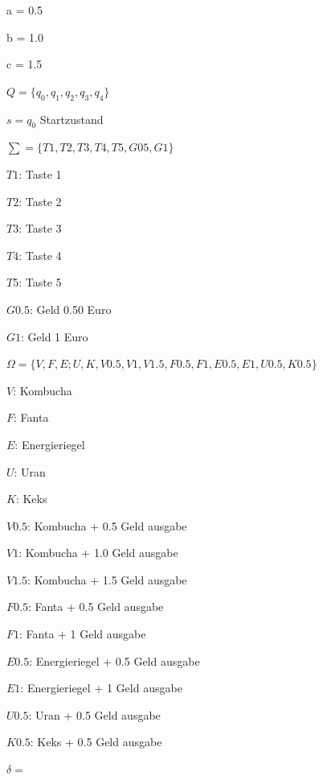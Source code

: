 \textpartdivider

\startitemize[packed]
\item
  a = 0.5
\item
  b = 1.0
\item
  c = 1.5
\stopitemize

\stopsectionlevel

\startsectionlevel[title={Automat},reference={automat}]

\startitemize[packed]
\item
  $Q = \{q_0, q_1, q_2, q_3, q_4\}$
\item
  $s = q_0$ Startzustand
\item
  $\sum = \{T1, T2, T3, T4, T5, G05, G1\}$
  \startitemize[packed]
  \item
    $T1$: Taste 1
  \item
    $T2$: Taste 2
  \item
    $T3$: Taste 3
  \item
    $T4$: Taste 4
  \item
    $T5$: Taste 5
  \item
    $G0.5$: Geld 0.50 Euro
  \item
    $G1$: Geld 1 Euro
  \stopitemize
\item
  $\Omega = \{V, F, E; U, K, V0.5, V1, V1.5, F0.5, F1, E0.5, E1, U0.5, K0.5\}$
  \startitemize[packed]
  \item
    $V$: Kombucha
  \item
    $F$: Fanta
  \item
    $E$: Energieriegel
  \item
    $U$: Uran
  \item
    $K$: Keks
  \item
    $V0.5$: Kombucha + 0.5 Geld ausgabe
  \item
    $V1$: Kombucha + 1.0 Geld ausgabe
  \item
    $V1.5$: Kombucha + 1.5 Geld ausgabe
  \item
    $F0.5$: Fanta + 0.5 Geld ausgabe
  \item
    $F1$: Fanta + 1 Geld ausgabe
  \item
    $E0.5$: Energieriegel + 0.5 Geld ausgabe
  \item
    $E1$: Energieriegel + 1 Geld ausgabe
  \item
    $U0.5$: Uran + 0.5 Geld ausgabe
  \item
    $K0.5$: Keks + 0.5 Geld ausgabe
  \stopitemize
\item
  $\delta =$
\stopitemize

